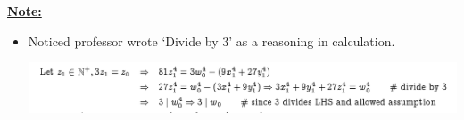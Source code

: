\documentclass[12pt]{article}
\begin{document}
\bigskip

\underline{\textbf{Note:}}

\bigskip

\begin{itemize}
    \item Noticed professor wrote `Divide by 3' as a reasoning in calculation.

    \begin{center}
    \includegraphics[width=0.8\linewidth]{images/term_test_1_v2_q2_note.png}
    \end{center}
\end{itemize}












\end{document}
